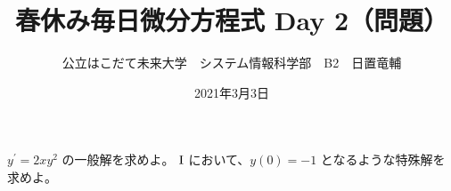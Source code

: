 \documentclass[dvipdfmx,uplatex]{jsarticle}
\title{春休み毎日微分方程式 Day 2（問題）}
\author{公立はこだて未来大学　システム情報科学部　B2　日置竜輔}
\date{2021年3月3日}
\begin{document}
\maketitle

\begin{qparts}
    \qpart $ y ^ {\prime} = 2xy ^ 2 $ の一般解を求めよ。
    \qpart $\rm I$ において、$ y(0) = -1 $ となるような特殊解を求めよ。
\end{qparts}
\end{document}
